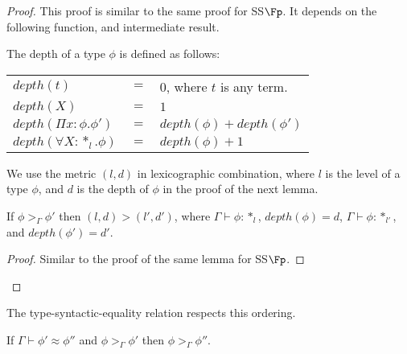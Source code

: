 \begin{proof}
  This proof is similar to the same proof for SS$\Fp$.  It depends on
  the following function, and intermediate result.
  \begin{definition}
  The depth of a type $\phi$ is defined as follows:
  \begin{center}
    \begin{tabular}{lll}
      $depth(t)$                  & $=$ & $0$, where $t$ is any term.\\
      $depth(X)$                  & $=$ & $1$\\
      $depth(\Pi x:\phi.\phi')$   & $=$ & $depth(\phi) + depth(\phi')$\\
      $depth(\forall X:*_l.\phi)$ & $=$ & $depth(\phi) + 1$\\
    \end{tabular}
  \end{center}
\end{definition}
\noindent
We use the metric $(l,d)$ in lexicographic combination, where $l$ is the level of
a type $\phi$, and $d$ is the depth of $\phi$ in the proof of the next lemma.  

\begin{lemma}
  \label{lemma:well-founded_measure_ssfe}
  If $\phi >_\Gamma \phi'$ then $(l,d) > (l',d')$, where $\Gamma \vdash \phi:*_l$, 
  $depth(\phi) = d$,  $\Gamma \vdash \phi:*_{l'}$, and $depth(\phi') = d'$.
\end{lemma}
\begin{proof}
  Similar to the proof of the same lemma for SS$\Fp$. 
\end{proof}
\end{proof}
\noindent
The type-syntactic-equality relation respects this ordering.
\begin{lemma}
  \label{lemma:typeq_ordering_ssfe}
  If $\Gamma \vdash \phi' \approx \phi''$ and $\phi >_{\Gamma} \phi'$ then $\phi >_\Gamma \phi''$.
\end{lemma}
